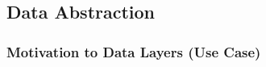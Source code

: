 \subsection{Data Abstraction}
\begin{frame}
	\frametitle{Motivation to Data Layers (Use Case)}	
%	
	

\end{frame}
